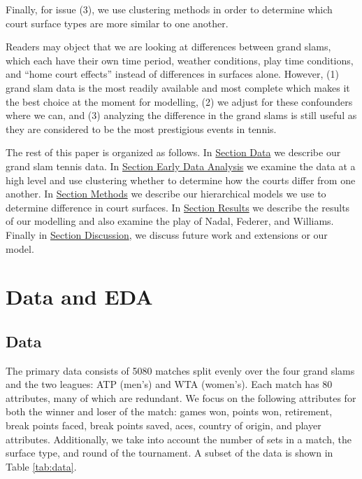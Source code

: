 \documentclass[]{article}
\begin{document}
Finally, for issue (3), we use clustering methods in order to determine
which court surface types are more similar to one another.

Readers may object that we are looking at differences between grand
slams, which each have their own time period, weather conditions, play
time conditions, and ``home court effects'' instead of differences in
surfaces alone. However, (1) grand slam data is the most readily
available and most complete which makes it the best choice at the moment
for modelling, (2) we adjust for these confounders where we can, and (3)
analyzing the difference in the grand slams is still useful as they are
considered to be the most prestigious events in tennis.

The rest of this paper is organized as follows. In
\protect\hyperlink{sec:data}{Section Data} we describe our grand slam
tennis data. In \protect\hyperlink{sec:eda}{Section Early Data Analysis}
we examine the data at a high level and use clustering whether to
determine how the courts differ from one another. In
\protect\hyperlink{sec:methods}{Section Methods} we describe our
hierarchical models we use to determine difference in court surfaces. In
\protect\hyperlink{sec:results}{Section Results} we describe the results
of our modelling and also examine the play of Nadal, Federer, and
Williams. Finally in \protect\hyperlink{discussion}{Section Discussion},
we discuss future work and extensions or our model.

\hypertarget{sec:data-eda}{%
\section{Data and EDA}\label{sec:data-eda}}

\hypertarget{sec:data}{%
\subsection{Data}\label{sec:data}}

The primary data consists of 5080 matches split evenly over the four
grand slams and the two leagues: ATP (men's) and WTA (women's). Each
match has 80 attributes, many of which are redundant. We focus on the
following attributes for both the winner and loser of the match: games
won, points won, retirement, break points faced, break points saved,
aces, country of origin, and player attributes. Additionally, we take
into account the number of sets in a match, the surface type, and round
of the tournament. A subset of the data is shown in Table
\ref{tab:data}.
\end{document}

